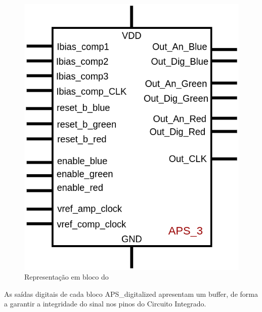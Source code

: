 \begin{figure}[htb]
 \centering
    \centering
    \caption{Representa{\c c}\~ao em bloco do \NomeBloco} \label{\NomeSFig}
    \includegraphics[scale=0.3]{Circuitos/APS_3_block.png}
\end{figure}

As sa\'idas digitais de cada bloco APS\_digitalized apresentam um buffer, de forma a garantir a integridade do sinal nos pinos do Circuito Integrado.
\clearpage